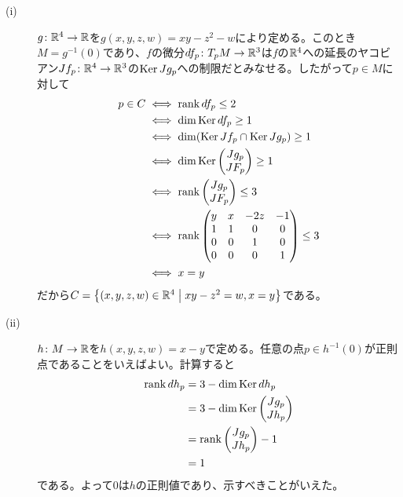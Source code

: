 \begin{sol} ${}$
  \begin{description}
    \item[(i)] $g \colon {\mathbb R}^4 \to {\mathbb R}$を$g(x,y,z,w) = xy - z^2 -w$により定める。このとき$M = g^{-1}(0)$であり、$f$の微分$df_p \colon T_p M \to {\mathbb R}^3$は$f$の${\mathbb R}^4$への延長のヤコビアン$Jf_p \colon {\mathbb R}^4 \to {\mathbb R}^3$の$\operatorname{Ker} Jg_p$への制限だとみなせる。したがって$p \in M$に対して
    \begin{align*}
      p \in C &\iff \operatorname{rank} df_p \leq 2 \\
      &\iff \dim \operatorname{Ker} df_p \geq 1 \\
      &\iff \dim (\operatorname{Ker} Jf_p \cap \operatorname{Ker} Jg_p) \geq 1 \\
      & \iff \dim \operatorname{Ker} \begin{pmatrix}  Jg_p \\ JF_p \end{pmatrix} \geq 1 \\
      &\iff \operatorname{rank} \begin{pmatrix}  Jg_p \\ JF_p \end{pmatrix} \leq 3 \\
      &\iff \operatorname{rank} \begin{pmatrix}  y &x& -2z& -1 \\ 1& 1& 0& 0 \\ 0& 0& 1& 0 \\ 0& 0& 0& 1 \end{pmatrix} \leq 3 \\
      &\iff x=y
    \end{align*}
    だから$C =\left\{ (x,y,z,w) \in {\mathbb R}^4 \mathrel{} \middle| \mathrel{} xy-z^2 = w, x=y \right\}$である。
    \item[(ii)] $h \colon M \to {\mathbb R}$を$h(x,y,z,w ) = x-y$で定める。任意の点$p \in h^{-1}(0)$が正則点であることをいえばよい。計算すると
    \begin{align*}
      \operatorname{rank} dh_p &= 3 - \dim \operatorname{Ker} dh_p \\
      &= 3- \dim \operatorname{Ker} \begin{pmatrix} Jg_p \\ Jh_p \end{pmatrix} \\
      &= \operatorname{rank} \begin{pmatrix} Jg_p \\ Jh_p \end{pmatrix} - 1 \\
      &= 1
    \end{align*}
    である。よって$0$は$h$の正則値であり、示すべきことがいえた。
  \end{description}
\end{sol}
